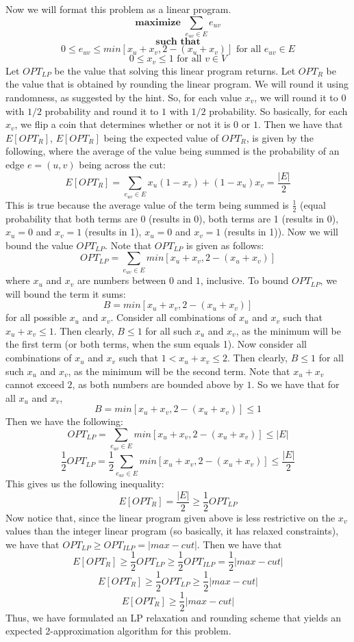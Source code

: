 \documentclass{article}
\begin{document}
Now we will format this problem as a linear program.
\[ \textbf{maximize } \sum_{e_{uv} \in E } e_{uv}\]
\[ \textbf{such that} \]
\[ 0 \leq e_{uv} \leq min[x_u + x_v, 2 - (x_u + x_v)] \text{ for all $e_{uv} \in E$} \]
\[ 0 \leq x_v \leq 1 \text{ for all $v \in V$} \]
Let $OPT_{LP}$ be the value that solving this linear program returns. Let
$OPT_R$ be the value that is obtained by rounding the linear program.
We will round it using randomness, as suggested by
the hint. So, for each value $x_v$, we will round it to $0$ with $1/2$
probability and round it to $1$ with $1/2$ probability. So basically, for each
$x_v$, we flip a coin that determines whether or not it is $0$ or $1$. Then we
have that $E[OPT_R]$, $E[OPT_R]$ being the expected value of $OPT_R$, is given
by the following, where the average of the value being summed is the probability of an edge $e
= (u,v)$ being across the cut:
\[ E[OPT_R] = \sum_{e_{uv} \in E} x_u(1 - x_v) + (1 - x_u)x_v = \frac{|E|}{2} \]
This is true because the average value of the term being summed is
$\frac{1}{2}$ (equal probability that both terms are 0 (results in 0), both terms are
1 (results in 0), $x_u = 0$ and $x_v = 1$ (results in 1), $x_u = 0$ and $x_v = 1$
(results in 1)).
Now we will bound the value $OPT_{LP}$. Note that $OPT_{LP}$ is given as
follows:
\[ OPT_{LP} = \sum_{e_{uv} \in E} min[x_u + x_v, 2 - (x_u + x_v)] \]
where $x_u$ and $x_v$ are numbers between $0$ and $1$, inclusive. To bound
$OPT_{LP}$, we will bound the term it sums:
\[ B = min[x_u + x_v, 2 - (x_u + x_v)] \]
for all possible $x_u$ and $x_v$. Consider all combinations of $x_u$ and $x_v$
such that $x_u + x_v \leq 1$. Then clearly, $B \leq 1$ for all such $x_u$ and
$x_v$, as the minimum will be the first term (or both terms, when the sum equals
1). Now consider all combinations of $x_u$ and $x_v$ such that $1 < x_u + x_v
\leq 2$. Then clearly, $B \leq 1$ for all such $x_u$ and $x_v$, as the minimum
will be the second term. Note that $x_u + x_v$ cannot exceed $2$, as both
numbers are bounded above by $1$. So we have that for all $x_u$ and $x_v$,
\[ B = min[x_u + x_v, 2 - (x_u + x_v)] \leq 1 \]
Then we have the following:
\[ OPT_{LP} = \sum_{e_{uv} \in E} min[x_u + x_v, 2 - (x_u + x_v)] \leq |E| \]
\[ \frac{1}{2} OPT_{LP} = \frac{1}{2} \sum_{e_{uv} \in E} min[x_u + x_v, 2 -
(x_u + x_v)] \leq \frac{|E|}{2} \]
This gives us the following inequality:
\[ E[OPT_R] = \frac{|E|}{2} \geq \frac{1}{2} OPT_{LP} \]
Now notice that, since the linear program given above is less restrictive on the
$x_v$ values than the integer linear program (so basically, it has relaxed
constraints), we have that $OPT_{LP} \geq OPT_{ILP} = |max-cut|$. Then we have
that
\[ E[OPT_R] \geq \frac{1}{2} OPT_{LP} \geq \frac{1}{2} OPT_{ILP} = \frac{1}{2} |max-cut| \]
\[ E[OPT_R] \geq \frac{1}{2} OPT_{LP} \geq \frac{1}{2} |max-cut| \]
\[ E[OPT_R] \geq \frac{1}{2} |max-cut| \]
Thus, we have formulated an LP relaxation and rounding scheme that yields an
expected 2-approximation algorithm for this problem.
\newpage
\end{document}
